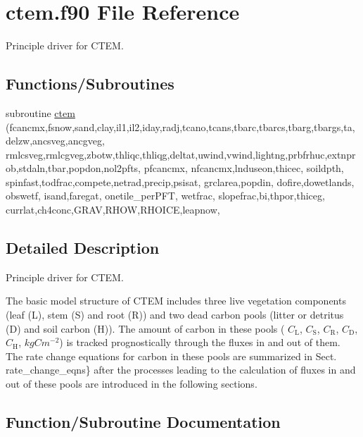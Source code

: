 \hypertarget{ctem_8f90}{}\section{ctem.\+f90 File Reference}
\label{ctem_8f90}


Principle driver for C\+T\+E\+M.  


\subsection*{Functions/\+Subroutines}
\begin{DoxyCompactItemize}
\item 
subroutine \hyperlink{ctem_8f90_ace1598599f37c24cac37dd963f23b497}{ctem} (fcancmx,fsnow,sand,clay,il1,il2,iday,radj,tcano,tcans,tbarc,tbarcs,tbarg,tbargs,ta,delzw,ancsveg,ancgveg, rmlcsveg,rmlcgveg,zbotw,thliqc,thliqg,deltat,uwind,vwind,lightng,prbfrhuc,extnprob,stdaln,tbar,popdon,nol2pfts, pfcancmx, nfcancmx,lnduseon,thicec, soildpth, spinfast,todfrac,compete,netrad,precip,psisat, grclarea,popdin, dofire,dowetlands, obswetf, isand,faregat, onetile\+\_\+per\+P\+F\+T, wetfrac, slopefrac,bi,thpor,thiceg, currlat,ch4conc,G\+R\+A\+V,R\+H\+O\+W,R\+H\+O\+I\+C\+E,leapnow,
\end{DoxyCompactItemize}


\subsection{Detailed Description}
Principle driver for C\+T\+E\+M. 

The basic model structure of C\+T\+E\+M includes three live vegetation components (leaf (L), stem (S) and root (R)) and two dead carbon pools (litter or detritus (D) and soil carbon (H)). The amount of carbon in these pools ( $C_\mathrm{L}$, $C_\mathrm{S}$, $C_\mathrm{R}$, $C_\mathrm{D}$, $C_\mathrm{H}$, $kgC m^{-2}$) is tracked prognostically through the fluxes in and out of them. The rate change equations for carbon in these pools are summarized in Sect. rate\+\_\+change\+\_\+eqns\} after the processes leading to the calculation of fluxes in and out of these pools are introduced in the following sections. 

\subsection{Function/\+Subroutine Documentation}
\hypertarget{ctem_8f90_ace1598599f37c24cac37dd963f23b497}{}
